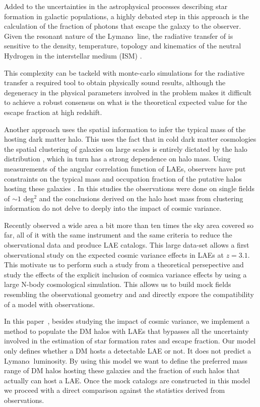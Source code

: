 \documentclass[usenatbib]{mn2e}
\newcommand{\documentname}{paper~}
\newcommand{\ly}{{\ifmmode{{\rm Ly}\alpha}\else{Ly$\alpha$~}\fi}}
\newcommand{\lya}{{Lyman$\alpha$~}}
\begin{document}
Added to the uncertainties in the astrophysical processes describing
star formation in galactic populations, a highly debated step in this
approach is the calculation of the fraction of \ly photons
that escape the galaxy to the observer. Given the resonant nature of
the \lya line, the radiative transfer of \ly is sensitive to the
density, temperature, topology and kinematics of the neutral Hydrogen
in the interstellar medium (ISM) \citep{Neufeld1991,ForeroRomero2011,
  Dijkstra2012,Laursen2013,Orsi2012}.  

This complexity can be tackeld with monte-carlo simulations for the
radiative transfer a required tool to obtain physically sound results,
although the degeneracy in the physical parameters involved in the
problem makes it difficult to achieve a robust consensus on what is
the theoretical expected value for the \ly escape fraction
at high redshift. 

Another approach uses the spatial information to infer the typical
mass of the hosting dark matter halo. This uses the fact that in cold
dark matter cosmologies the spatial clustering of galaxies on large
scales is entirely dictated by the halo distribution
\citep{Colberg00}, which in turn has a strong dependence on halo
mass. Using measurements of the angular correlation function of LAEs,
observers have put constraints on the typical mass and occupation
fraction of the putative halos hosting these galaxies
\citep{Hayashino2004,Gawiser07,Nilsson2007,Ouchi2010}. In this
studies the observations were done on single fields of $\sim 1$
deg$^{2}$ and the conclusions derived on the halo host mass from
clustering information do not delve to deeply into the impact of
cosmic variance.

Recently \cite{Yamada2012} observed a wide area a bit more than ten
times the sky area covered so far, all of it with the same instrument
and the same criteria to reduce the observational data and produce LAE
catalogs. This large data-set allows a first observational study on the
expected cosmic variance effects in LAEs at $z=3.1$. This motivate us
to perform such a study from a theoretical persepective and study the
effects of the explicit inclusion of cosmica variance effects by using
a large N-body cosmological simulation. This
allows us to build mock fields resembling the observational geometry
and and directly expore the compatibility of a model with
observations.

In this \documentname, besides studying the impact of cosmic variance,
we implement a method to populate the DM halos with LAEs that bypasses
all the uncertainty involved in the estimation of star formation rates
and \ly escape fraction. Our model only defines whether a DM hosts a
detectable LAE or not. It does not predict a \lya luminosity. By using
this model we want to define the preferred mass range of DM halos
hosting these galaxies and the fraction of such halos that actually
can host a LAE.  Once the mock catalogs are constructed in this model
we proceed with a direct comparison against the statistics derived
from observations. 
\end{document}
